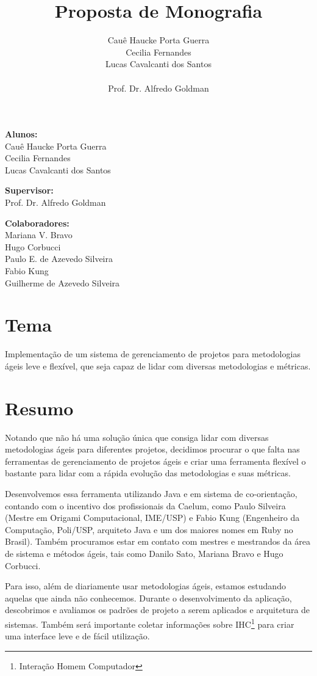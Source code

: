 \documentclass[titlepage]{article}
\title{Proposta de Monografia}
\author{Cauê Haucke Porta Guerra\\Cecilia Fernandes\\Lucas Cavalcanti dos Santos\\ \\Prof. Dr. Alfredo Goldman}
\begin{document}
\maketitle

\begin{description} 
\item{\textbf{Alunos:}\\Cauê Haucke Porta Guerra\\Cecilia Fernandes\\Lucas Cavalcanti dos Santos}
\item{\textbf{Supervisor:}\\Prof. Dr. Alfredo Goldman}
\item{\textbf{Colaboradores:}\\Mariana V. Bravo\\Hugo Corbucci\\Paulo E. de Azevedo Silveira\\Fabio Kung\\Guilherme de Azevedo Silveira}
\end{description}

\section{Tema}
Implementação de um sistema de gerenciamento de projetos para metodologias ágeis leve e flexível, que seja capaz de lidar com diversas metodologias e métricas.


\section{Resumo}
Notando que não há uma solução única que consiga lidar com diversas metodologias ágeis para diferentes projetos, decidimos procurar o que falta nas ferramentas de gerenciamento de projetos ágeis e criar uma ferramenta flexível o bastante para lidar com a rápida evolução das metodologias e suas métricas.

Desenvolvemos essa ferramenta utilizando Java e em sistema de co-orientação, contando com o incentivo dos profissionais da Caelum, como Paulo Silveira (Mestre em Origami Computacional, IME/USP) e Fabio Kung (Engenheiro da Computação, Poli/USP, arquiteto Java e um dos maiores nomes em Ruby no Brasil). Também procuramos estar em contato com mestres e mestrandos da área de sistema e métodos ágeis, tais como Danilo Sato, Mariana Bravo e Hugo Corbucci.

Para isso, além de diariamente usar metodologias ágeis, estamos estudando aquelas que ainda não conhecemos. Durante o desenvolvimento da aplicação, descobrimos e avaliamos os padrões de projeto a serem aplicados e arquitetura de sistemas. Também será importante coletar informações sobre IHC\footnote{Interação Homem Computador} para criar uma interface leve e de fácil utilização.
\end{document}

